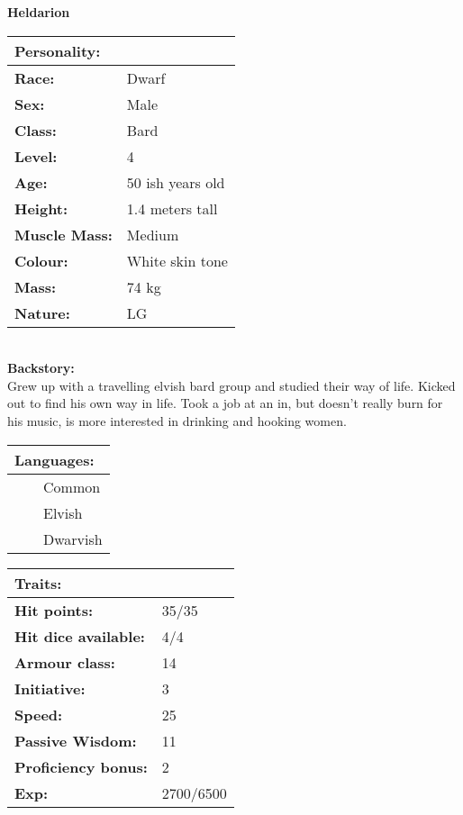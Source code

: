 \documentclass[11pt]{article}
\newcommand{\tabitem}{~~\llap{--}~~}
\begin{document}
	\begin{center}
\Huge \textbf{Heldarion}
	\end{center}
	\begin{multicols}{2}
\noindent \begin{tabularx}{95mm}{@{}l l}
\Large \textbf{Personality:} 	& 						\\
\hline
\textbf{Race:} 					& Dwarf	 				\\
\textbf{Sex:} 					& Male 					\\
\textbf{Class:}					& Bard					\\
\textbf{Level:} 				& 4						\\
\textbf{Age:} 					& 50 ish years old		\\
\textbf{Height:} 				& 1.4 meters tall 	\\
\textbf{Muscle Mass:} 			& Medium 				\\
\textbf{Colour:} 				& White skin tone 	\\
\textbf{Mass:} 					& 74 kg		 		\\
\textbf{Nature:} 				& LG
		\end{tabularx} \\
\textbf{Backstory:} \\
Grew up with a travelling elvish bard group and studied their way of life. Kicked out to find his own way in life. Took a job at an in, but doesn't really burn for his music, is more interested in drinking and hooking women.

\vspace{2mm}

\noindent \begin{tabularx}{95mm}{@{}l}
{\Large \textbf{Languages:}} \\
\hline
\tabitem Common \\
\tabitem Elvish	\\
\tabitem Dwarvish
		\end{tabularx}

\vspace{2mm}

\noindent \begin{tabularx}{95mm}{@{}l l}
\Large \textbf{Traits:}		 	& 							\\
\hline
\textbf{Hit points:} 			& 35/35 					\\
\textbf{Hit dice available:}	& 4/4						\\
\textbf{Armour class:} 			& 14						\\
\textbf{Initiative:} 			& 3							\\
\textbf{Speed:} 				& 25	 					\\
\textbf{Passive Wisdom:} 		& 11			 			\\
\textbf{Proficiency bonus:}		& 2							\\
\textbf{Exp:} 					& 2700/6500
		\end{tabularx}


\end{multicols}
\end{document}
